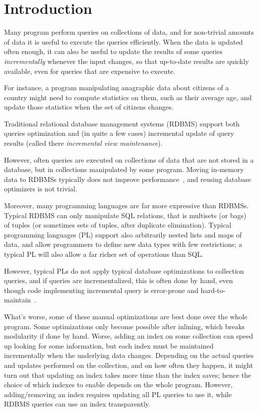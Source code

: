 \chapter{Introduction}

Many program perform queries on collections of data, and for non-trivial amounts
of data it is useful to execute the queries efficiently. When the data is
updated often enough, it can also be useful to update the results of some
queries \emph{incrementally} whenever the input changes, so that up-to-date
results are quickly available, even for queries that are expensive to execute.

For instance, a program manipulating anagraphic data about citizens of a country
might need to compute statistics on them, such as their average age, and update
those statistics when the set of citizens changes.

Traditional relational database management systems (RDBMS) support both queries
optimization and (in quite a few cases) incremental update of query results
(called there \emph{incremental view maintenance}).

However, often queries are executed on collections of data that are not stored
in a database, but in collections manipulated by some program. Moving in-memory
data to RDBMSs typically does not improve
performance~\citep{Stonebraker07,Rompf2015functional}, and reusing database
optimizers is not trivial.

Moreover, many programming languages are far more expressive than RDBMSs.
Typical RDBMS can only manipulate SQL relations, that is multisets (or bags) of
tuples (or sometimes sets of tuples, after duplicate elimination). Typical
programming languages (PL) support also arbitrarily nested lists and maps of
data, and allow programmers to define new data types with few restrictions; a
typical PL will also allow a far richer set of operations than SQL.

However, typical PLs do not apply typical database optimizations to collection
queries, and if queries are incrementalized, this is often done by hand, even
though code implementing incremental query is error-prone and
hard-to-maintain~\citep{Salvaneschi13reactive}.

What's worse, some of these manual optimizations are best done over the whole
program. Some optimizations only become possible after inlining, which breaks
modularity if done by hand.
Worse, adding an index on some collection can speed up looking
for some information, but each index must be maintained incrementally when the
underlying data changes. Depending on the actual queries and updates performed
on the collection, and on how often they happen, it might turn out that updating
an index takes more time than the index saves; hence the choice of which indexes
to enable depends on the whole program. However, adding/removing an index
requires updating all PL queries to use it, while RDBMS queries can use an index
transparently.

